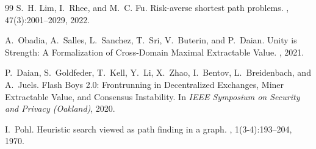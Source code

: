 \begin{thebibliography}{99}
S.~H. Lim, I.~Rhee, and M.~C. Fu.
\newblock Risk-averse shortest path problems.
, 47(3):2001--2029, 2022.

A.~Obadia, A.~Salles, L.~Sanchez, T.~Sri, V.~Buterin, and P.~Daian.
\newblock Unity is Strength: A Formalization of Cross-Domain Maximal Extractable Value.
, 2021.

P.~Daian, S.~Goldfeder, T.~Kell, Y.~Li, X.~Zhao, I.~Bentov, L.~Breidenbach, and A.~Juels.
\newblock Flash Boys 2.0: Frontrunning in Decentralized Exchanges, Miner Extractable Value, and Consensus Instability.
\newblock In {\em IEEE Symposium on Security and Privacy (Oakland)}, 2020.

I.~Pohl.
\newblock Heuristic search viewed as path finding in a graph.
, 1(3-4):193--204, 1970.

\end{thebibliography}

